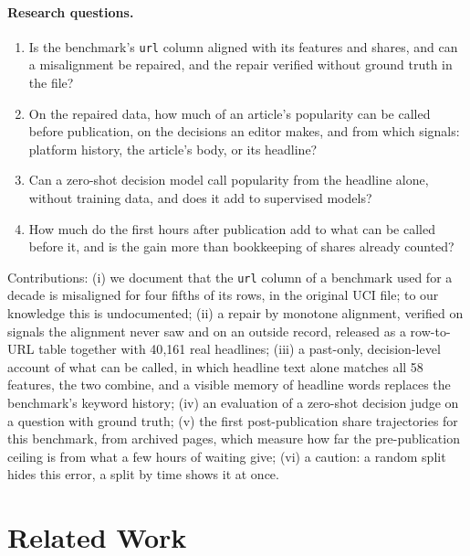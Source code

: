 \documentclass[10pt,a4paper,twocolumn]{article}
\begin{document}
\paragraph{Research questions.}
\begin{enumerate}\setlength\itemsep{0pt}
  \item[RQ1] Is the benchmark's \texttt{url} column aligned with its features and shares, and can a misalignment
             be repaired, and the repair verified without ground truth in the file?
  \item[RQ2] On the repaired data, how much of an article's popularity can be called before publication, on the
             decisions an editor makes, and from which signals: platform history, the article's body, or its
             headline?
  \item[RQ3] Can a zero-shot decision model call popularity from the headline alone, without training data, and
             does it add to supervised models?
  \item[RQ4] How much do the first hours after publication add to what can be called before it, and is the
             gain more than bookkeeping of shares already counted?
\end{enumerate}
\noindent Contributions: (i) we document that the \texttt{url} column of a benchmark used for a decade is
misaligned for four fifths of its rows, in the original UCI file; to our knowledge this is undocumented; (ii) a
repair by monotone alignment, verified on signals the alignment never saw and on an outside record, released as a row-to-URL table
together with 40{,}161 real headlines; (iii) a past-only, decision-level account of what can be called, in which
headline text alone matches all 58 features, the two combine, and a visible memory of headline words replaces the
benchmark's keyword history; (iv) an evaluation of a zero-shot decision judge
\citep{zheng2023judge,li2026jev} on a question with ground truth; (v) the first post-publication share trajectories for this benchmark, from archived pages, which measure how far the pre-publication ceiling is from what a few hours of waiting give; (vi) a caution: a random split hides this error, a split by time shows it at once.

\section{Related Work}
\end{document}
